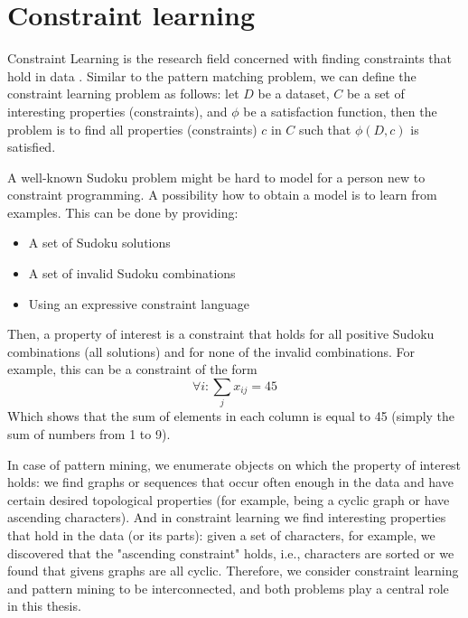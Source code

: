 \section{Constraint learning}
Constraint Learning is the research field concerned with finding
constraints that hold in data \parencite{constraint_learning,QUACQ,Conacq}.
Similar to the pattern matching problem, we can define 
the constraint learning problem as follows:
let $D$ be a dataset, $C$ be a set of interesting properties (constraints), and
$\phi$ be a satisfaction function, 
then the problem is to find all properties (constraints) $c$ in $C$ such that $\phi(D,c)$ is satisfied.
\begin{example}
    A well-known Sudoku problem might be hard to model for a person
    new to constraint programming. A possibility how to obtain a model
    is to learn from examples. This can be done by providing:
    \begin{itemize}
        \item A set of Sudoku solutions
        \item A set of invalid Sudoku combinations
        \item Using an expressive constraint language 
    \end{itemize}
Then, a property of interest is a constraint that holds for all
    positive Sudoku combinations (all solutions) and for none of
    the invalid combinations. For example, this can be a constraint of
    the form
\begin{equation*}
    \forall i: \sum_j x_{ij} = 45
\end{equation*}
    Which shows that the sum of elements in each column is equal to 45
    (simply the sum of numbers from 1 to 9).
\end{example}

In case of pattern mining, we enumerate objects on which the property
of interest holds: we find graphs or sequences that occur often enough
in the data and have certain desired topological properties (for example, being a
cyclic graph or have ascending characters). And in constraint learning we find interesting
properties that hold in the data (or its parts): given a set of
characters, for example, we discovered that the "ascending constraint" holds, i.e.,
characters are sorted or we found that givens graphs are all cyclic.
Therefore, we consider constraint learning and pattern mining to be interconnected, and both problems play a central role in this thesis.

